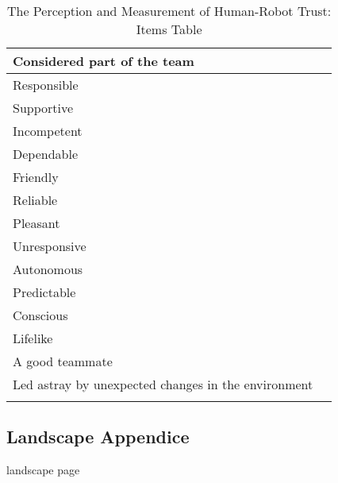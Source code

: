 \begin{longtable}{l|l}
	Considered part of the team & \\ \hline
	Responsible & \\ \hline
	Supportive & \\ \hline
	Incompetent & \\ \hline
	Dependable & \\ \hline
	Friendly & \\ \hline
	Reliable & \\ \hline
	Pleasant & \\ \hline
	Unresponsive & \\ \hline
	Autonomous & \\ \hline
	Predictable & \\ \hline
	Conscious & \\ \hline
	Lifelike & \\ \hline
	A good teammate & \\ \hline
	Led astray by unexpected changes in the environment & \\
	\caption{The Perception and Measurement of Human-Robot Trust: Items Table}
	\label{app:measurement.items.table}	
\end{longtable}

\begin{landscape}
	\section{Landscape Appendice}
	\label{app:Educational}	
	landscape page
\end{landscape}

\newpage
